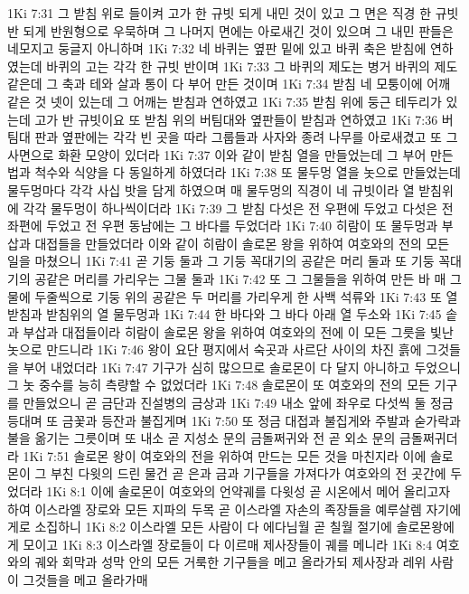 1Ki 7:31  그 받침 위로 들이켜 고가 한 규빗 되게 내민 것이 있고 그 면은 직경 한 규빗 반 되게 반원형으로 우묵하며 그 나머지 면에는 아로새긴 것이 있으며 그 내민 판들은 네모지고 둥글지 아니하며
1Ki 7:32  네 바퀴는 옆판 밑에 있고 바퀴 축은 받침에 연하였는데 바퀴의 고는 각각 한 규빗 반이며
1Ki 7:33  그 바퀴의 제도는 병거 바퀴의 제도 같은데 그 축과 테와 살과 통이 다 부어 만든 것이며
1Ki 7:34  받침 네 모퉁이에 어깨 같은 것 넷이 있는데 그 어깨는 받침과 연하였고
1Ki 7:35  받침 위에 둥근 테두리가 있는데 고가 반 규빗이요 또 받침 위의 버팀대와 옆판들이 받침과 연하였고
1Ki 7:36  버팀대 판과 옆판에는 각각 빈 곳을 따라 그룹들과 사자와 종려 나무를 아로새겼고 또 그 사면으로 화환 모양이 있더라
1Ki 7:37  이와 같이 받침 열을 만들었는데 그 부어 만든 법과 척수와 식양을 다 동일하게 하였더라
1Ki 7:38  또 물두멍 열을 놋으로 만들었는데 물두멍마다 각각 사십 밧을 담게 하였으며 매 물두멍의 직경이 네 규빗이라 열 받침위에 각각 물두멍이 하나씩이더라
1Ki 7:39  그 받침 다섯은 전 우편에 두었고 다섯은 전 좌편에 두었고 전 우편 동남에는 그 바다를 두었더라
1Ki 7:40  히람이 또 물두멍과 부삽과 대접들을 만들었더라 이와 같이 히람이 솔로몬 왕을 위하여 여호와의 전의 모든 일을 마쳤으니
1Ki 7:41  곧 기둥 둘과 그 기둥 꼭대기의 공같은 머리 둘과 또 기둥 꼭대기의 공같은 머리를 가리우는 그물 둘과
1Ki 7:42  또 그 그물들을 위하여 만든 바 매 그물에 두줄씩으로 기둥 위의 공같은 두 머리를 가리우게 한 사백 석류와
1Ki 7:43  또 열 받침과 받침위의 열 물두멍과
1Ki 7:44  한 바다와 그 바다 아래 열 두소와
1Ki 7:45  솥과 부삽과 대접들이라 히람이 솔로몬 왕을 위하여 여호와의 전에 이 모든 그릇을 빛난 놋으로 만드니라
1Ki 7:46  왕이 요단 평지에서 숙곳과 사르단 사이의 차진 흙에 그것들을 부어 내었더라
1Ki 7:47  기구가 심히 많으므로 솔로몬이 다 달지 아니하고 두었으니 그 놋 중수를 능히 측량할 수 없었더라
1Ki 7:48  솔로몬이 또 여호와의 전의 모든 기구를 만들었으니 곧 금단과 진설병의 금상과
1Ki 7:49  내소 앞에 좌우로 다섯씩 둘 정금 등대며 또 금꽃과 등잔과 불집게며
1Ki 7:50  또 정금 대접과 불집게와 주발과 숟가락과 불을 옮기는 그릇이며 또 내소 곧 지성소 문의 금돌쩌귀와 전 곧 외소 문의 금돌쩌귀더라
1Ki 7:51  솔로몬 왕이 여호와의 전을 위하여 만드는 모든 것을 마친지라 이에 솔로몬이 그 부친 다윗의 드린 물건 곧 은과 금과 기구들을 가져다가 여호와의 전 곳간에 두었더라
1Ki 8:1  이에 솔로몬이 여호와의 언약궤를 다윗성 곧 시온에서 메어 올리고자 하여 이스라엘 장로와 모든 지파의 두목 곧 이스라엘 자손의 족장들을 예루살렘 자기에게로 소집하니
1Ki 8:2  이스라엘 모든 사람이 다 에다님월 곧 칠월 절기에 솔로몬왕에게 모이고
1Ki 8:3  이스라엘 장로들이 다 이르매 제사장들이 궤를 메니라
1Ki 8:4  여호와의 궤와 회막과 성막 안의 모든 거룩한 기구들을 메고 올라가되 제사장과 레위 사람이 그것들을 메고 올라가매
